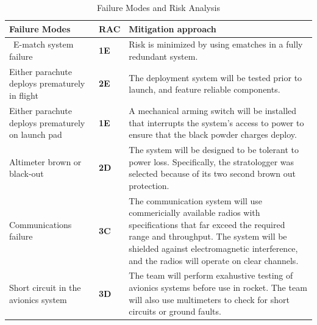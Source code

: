  \begin{table}[htbp]
    \centering
    \caption{Failure Modes and Risk Analysis}
    \begin{tabularx}{\linewidth}{X >{\centering\arraybackslash}m{1in} X}
    \toprule
    \textbf{Failure Modes} & \textbf{RAC} & \textbf{Mitigation approach} \\
    \midrule
    \renewcommand{\arraystretch}{1.5}%
    \ E-match system failure & \cellcolor{green!25} \textbf{\newline \newline 1E} 
  & Risk is minimized by using ematches in a fully redundant system. \\
  Either parachute deploys prematurely in flight & \cellcolor{green!25}\textbf{\newline \newline \newline 2E} & The deployment system will be tested prior to launch, and feature reliable components.  \\
  Either parachute deploys prematurely on launch pad & \cellcolor{green!25}\textbf{\newline \newline \newline 1E} & A mechanical arming switch will be installed that interrupts the system's access to power to ensure that the black powder charges deploy.  \\
  Altimeter brown or black-out & \cellcolor{orange!25}\textbf{\newline \newline \newline \newline 2D} & The system will be designed to be tolerant to power loss. Specifically, the stratologger was selected because of its two second brown out protection. \\
  Communications failure & \cellcolor{orange!25}\textbf{\newline \newline \newline \newline \newline 3C} & The communication system will use commericially available radios with specifications that far exceed the required range and throughput. The system will be shielded against electromagnetic interference, and the radios will operate on clear channels. \\
  Short circuit in the avionics system & \cellcolor{green!25}\textbf{\newline \newline 3D} & The team will perform exahustive testing of avionics systems before use in rocket. The team will also use multimeters to check for short circuits or ground faults.  \\

\end{tabularx}
\end{table}
